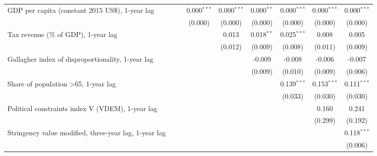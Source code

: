 \begin{table}[htbp]
\begin{tabular}{lcccccccc}
      GDP per capita (constant 2015 US\$), 1-year lag                        &         &         & 0.000$^{***}$ & 0.000$^{***}$ & 0.000$^{**}$   & 0.000$^{***}$  & 0.000$^{***}$  & 0.000$^{***}$\\   
                                                                             &         &         & (0.000)       & (0.000)       & (0.000)        & (0.000)        & (0.000)        & (0.000)\\   
      Tax revenue (\% of GDP), 1-year lag                                    &         &         &               & 0.013         & 0.018$^{**}$   & 0.025$^{***}$  & 0.008          & 0.005\\   
                                                                             &         &         &               & (0.012)       & (0.009)        & (0.008)        & (0.011)        & (0.009)\\   
      Gallagher index of disproportionality, 1-year lag                      &         &         &               &               & -0.009         & -0.008         & -0.006         & -0.007\\   
                                                                             &         &         &               &               & (0.009)        & (0.010)        & (0.009)        & (0.006)\\   
      Share of population >65, 1-year lag                                    &         &         &               &               &                & 0.139$^{***}$  & 0.153$^{***}$  & 0.111$^{***}$\\   
                                                                             &         &         &               &               &                & (0.033)        & (0.030)        & (0.030)\\   
      Political constraints index V (VDEM), 1-year lag                       &         &         &               &               &                &                & 0.160          & 0.241\\   
                                                                             &         &         &               &               &                &                & (0.299)        & (0.192)\\   
      Stringency value modified, three-year lag, 1-year lag                  &         &         &               &               &                &                &                & 0.118$^{***}$\\   
                                                                             &         &         &               &               &                &                &                & (0.006)\\   

\end{tabular}
\end{table}
